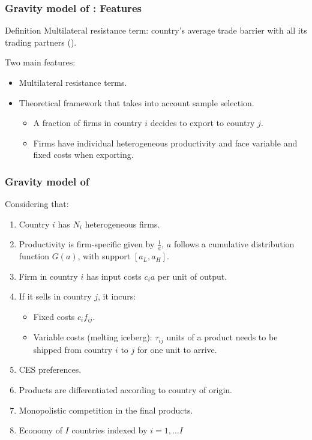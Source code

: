 \begin{frame}[label=Gravity model]
    \frametitle{Gravity model of \cite{helpman2008estimating} : Features}
    \begin{block}{Definition}
        Multilateral resistance term: country's average trade barrier with all its trading partners (\cite{anderson2003gravity}).
    \end{block} 
    Two main features:
    \begin{itemize}
        \item Multilateral resistance terms.
        \item Theoretical framework that takes into account sample selection. 
        \begin{itemize}
            \item A fraction of firms in country $i$ decides to export to country $j$. 
            \item Firms have individual heterogeneous productivity and face variable and fixed costs when exporting.
        \end{itemize}
    \end{itemize}
  \end{frame}
  \begin{frame}
    \frametitle{Gravity model of \cite{helpman2008estimating}}
    Considering that:
    \begin{enumerate}
        \item Country $i$ has $N_i$ heterogeneous firms.
        \item Productivity is firm-specific given by $\frac{1}{a}$, $a$ follows a cumulative distribution function $G(a)$, with support $[a_L, a_H]$.
        \item Firm in country $i$ has input costs $c_ia$ per unit of output.
        \item If it sells in country $j$, it incurs:
        \begin{itemize}
            \item Fixed costs $c_i f_{ij}$.
            \item Variable costs (melting iceberg): $\tau_{ij}$ units of a product needs to be shipped from country $i$ to $j$ for one unit to arrive.
        \end{itemize} 
        \item CES preferences.
        \item Products are differentiated according to country of origin.
        \item Monopolistic competition in the final products.
        \item Economy of $I$ countries indexed by $i=1,...I$
    \end{enumerate}
  \end{frame}
  
